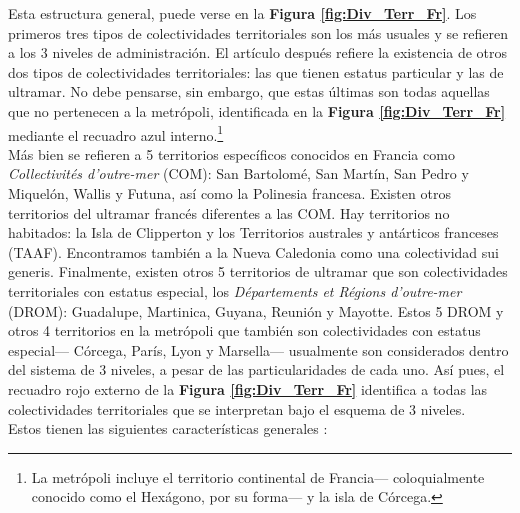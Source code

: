 Esta estructura general, puede verse en la \textbf{Figura \ref{fig:Div_Terr_Fr}}. Los primeros tres tipos de colectividades territoriales son los más usuales y se refieren a los 3 niveles de administración. El artículo después refiere la existencia de otros dos tipos de colectividades territoriales: las que tienen estatus particular y las de ultramar. No debe pensarse, sin embargo, que estas últimas son todas aquellas que no pertenecen a la metrópoli, identificada en la \textbf{Figura \ref{fig:Div_Terr_Fr}} mediante el recuadro azul interno.\footnote{La metrópoli incluye el territorio continental de Francia--- coloquialmente conocido como el Hexágono, por su forma--- y la isla de Córcega.}\\ 

Más bien se refieren a 5 territorios específicos conocidos en Francia como \textit{Collectivités d'outre-mer} (COM): San Bartolomé, San Martín, San Pedro y Miquelón, Wallis y Futuna, así como la Polinesia francesa. Existen otros territorios del ultramar francés diferentes a las COM. Hay territorios no habitados: la Isla de Clipperton y los Territorios australes y antárticos franceses (TAAF). Encontramos también a la Nueva Caledonia como una colectividad sui generis. Finalmente, existen otros 5 territorios de ultramar que son colectividades territoriales con estatus especial, los \textit{Départements et Régions d'outre-mer} (DROM): Guadalupe, Martinica, Guyana, Reunión y Mayotte. Estos 5 DROM y otros 4 territorios en la metrópoli que también son colectividades con estatus especial--- Córcega, París, Lyon y Marsella--- usualmente son considerados dentro del sistema de 3 niveles, a pesar de las particularidades de cada uno. Así pues, el recuadro rojo externo de la \textbf{Figura \ref{fig:Div_Terr_Fr}} identifica a todas las colectividades territoriales que se interpretan bajo el esquema de 3 niveles.\\

Estos tienen las siguientes características generales \parencite{AN17b}: 

